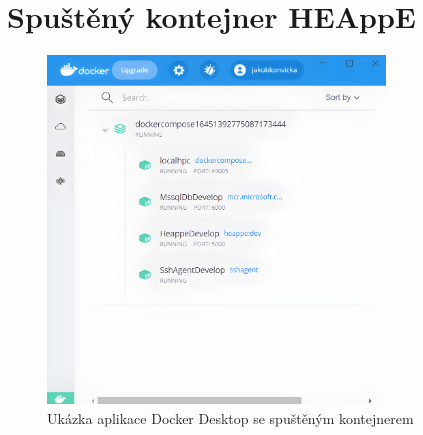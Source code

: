\chapter{Spuštěný kontejner HEAppE}
\begin{figure}[!h]
	\centering
	\includegraphics[width=0.8\textwidth]{Figures/dockerdesktophq.jpg}
	\caption{Ukázka aplikace Docker Desktop se spuštěným kontejnerem}
    \label{fig:WritingThesis}
\end{figure}
